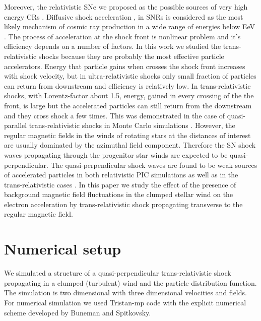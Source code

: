 \documentclass[a4paper]{jpconf}
\begin{document}
Moreover, the relativistic SNe we proposed as the possible sources of very high energy CRs \cite{2007PhRvD..76h3009W,2011NatCo...2E.175C,2008ApJ...673..928B,2013ApJ...776...46E,BEMO18}. Diffusive shock acceleration \cite{Bell78}, \cite{Blandford78} in SNRs is considered as the most likely mechanism of cosmic ray production in a wide range of energies below EeV \cite{BEMO18}. The process of acceleration at the shock front is nonlinear problem and it's efficiency depends on a number of factors. In this work we studied the trans-relativistic shocks because they are probably the most effective particle accelerators. Energy that particle gains when crosses the shock front increases with shock velocity, but in ultra-relativistic shocks only small fraction of particles can return from downstream and efficiency is relatively low. In trans-relativistic shocks, with Lorentz-factor about 1.5, energy, gained in every crossing of the the front, is large but the accelerated particles  can still return from the downstream and they cross shock a few times. This was demonstrated in the case of quasi-parallel trans-relativistic shocks in Monte Carlo simulations \cite{2013ApJ...776...46E,BEMO18}. However, the regular magnetic fields in the winds of rotating stars at the distances of interest are usually dominated by the azimuthal field component. Therefore the SN shock waves propagating through the progenitor star winds are expected to be quasi-perpendicular.  The quasi-perpendicular shock waves are found to be weak sources of accelerated particles in both  relativistic PIC simulations \cite{Sironi2011} as well as in the trans-relativistic cases \cite{Romansky18,Crumley2019}. In this paper we study the effect of the presence of  background magnetic field fluctuations in the clumped stellar wind on the electron acceleration by trans-relativistic shock propagating transverse to the regular magnetic field.   

\section{Numerical setup}
We simulated a structure of a quasi-perpendicular trans-relativistic shock propagating in a clumped (turbulent) wind and the particle distribution function. The simulation is two dimensional with three dimensional velocities and fields. For numerical simulation we used Tristan-mp code with the explicit numerical scheme developed by Buneman \cite{Buneman93} and  Spitkovsky\cite{Spitkovsky2005}.
\end{document}
